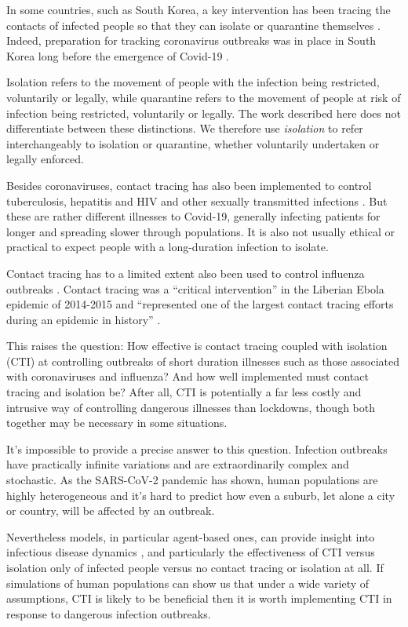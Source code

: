 \documentclass{article}
\begin{document}
In some countries, such as South Korea, a key intervention has been tracing the
contacts of infected people so that they can isolate or quarantine themselves
\cite{Jung2020,Lee2020}. Indeed, preparation for tracking coronavirus outbreaks
was in place in South Korea long before the emergence of Covid-19
\cite{Park2016}.

Isolation refers to the movement of people with the infection being restricted,
voluntarily or legally, while quarantine refers to the movement of people at
risk of infection being restricted, voluntarily or legally. The work described
here does not differentiate between these distinctions. We therefore use
\emph{isolation} to refer interchangeably to isolation or quarantine, whether
voluntarily undertaken or legally enforced.

Besides coronaviruses, contact tracing has also been implemented to control
tuberculosis, hepatitis and HIV and other sexually transmitted infections
\cite{Dennis2018,MacPherson2019,Katzman2019,Stokes1999}. But these are rather
different illnesses to Covid-19, generally infecting patients for longer and
spreading slower through populations. It is also not usually ethical or
practical to expect people with a long-duration infection to isolate.

Contact tracing has to a limited extent also been used to control influenza
outbreaks \cite{Swaan2011,Eames2010}. Contact tracing was a ``critical
intervention'' in the Liberian Ebola epidemic of 2014-2015 and ``represented one
of the largest contact tracing efforts during an epidemic in history'' \cite{Swanson2018}.

This raises the question: How effective is contact tracing coupled with
isolation (CTI) at controlling outbreaks of short duration illnesses such as
those associated with coronaviruses and influenza? And how well
implemented must contact tracing and isolation be? After all, CTI is potentially
a far less costly and intrusive way of controlling dangerous illnesses than
lockdowns, though both together may be necessary in some situations.

It's impossible to provide a precise answer to this question. Infection
outbreaks have practically infinite variations and are extraordinarily complex
and stochastic. As the SARS-CoV-2 pandemic has shown, human populations are
highly heterogeneous and it's hard to predict how even a suburb, let alone a
city or country, will be affected by an outbreak.

Nevertheless models, in particular agent-based ones, can provide insight into
infectious disease dynamics \cite{Geffen2018,Hunter2019}, and particularly the
effectiveness of CTI versus isolation only of infected people versus no contact
tracing or isolation at all. If simulations of human populations can show us
that under a wide variety of assumptions, CTI is likely to be beneficial then it
is worth implementing CTI in response to dangerous infection outbreaks.
\end{document}
